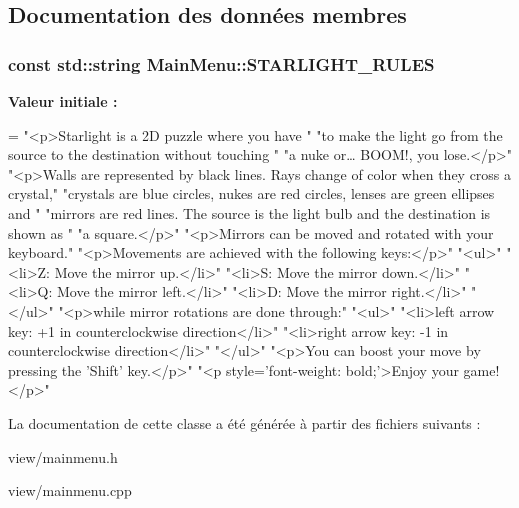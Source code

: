 \subsection{Documentation des données membres}
\hypertarget{classMainMenu_a48a2d4c53fc90f45d2cf63446d811b24}{
\subsubsection[{S\+T\+A\+R\+L\+I\+G\+H\+T\+\_\+\+R\+U\+L\+E\+S}]{\setlength{\rightskip}{0pt plus 5cm}const std\+::string Main\+Menu\+::\+S\+T\+A\+R\+L\+I\+G\+H\+T\+\_\+\+R\+U\+L\+E\+S\hspace{0.3cm}{\ttfamily [static]}}}\label{classMainMenu_a48a2d4c53fc90f45d2cf63446d811b24}
{\bfseries Valeur initiale \+:}
\begin{DoxyCode}
=
    \textcolor{stringliteral}{"<p>Starlight is a 2D puzzle where you have "}
    \textcolor{stringliteral}{"to make the light go from the source to the destination without touching "}
    \textcolor{stringliteral}{"a nuke or… BOOM!, you lose.</p>"}
    \textcolor{stringliteral}{"<p>Walls are represented by black lines. Rays change of color when they cross a crystal,"}
    \textcolor{stringliteral}{"crystals are blue circles, nukes are red circles, lenses are green ellipses and "}
    \textcolor{stringliteral}{"mirrors are red lines. The source is the light bulb and the destination is shown as "}
    \textcolor{stringliteral}{"a square.</p>"}
    \textcolor{stringliteral}{"<p>Mirrors can be moved and rotated with your keyboard."}
    \textcolor{stringliteral}{"<p>Movements are achieved with the following keys:</p>"}
    \textcolor{stringliteral}{"<ul>"}
        \textcolor{stringliteral}{"<li>Z: Move the mirror up.</li>"}
        \textcolor{stringliteral}{"<li>S: Move the mirror down.</li>"}
        \textcolor{stringliteral}{"<li>Q: Move the mirror left.</li>"}
        \textcolor{stringliteral}{"<li>D: Move the mirror right.</li>"}
    \textcolor{stringliteral}{"</ul>"}
    \textcolor{stringliteral}{"<p>while mirror rotations are done through:"}
    \textcolor{stringliteral}{"<ul>"}
        \textcolor{stringliteral}{"<li>left arrow key: +1 in counterclockwise direction</li>"}
        \textcolor{stringliteral}{"<li>right arrow key: -1 in counterclockwise direction</li>"}
    \textcolor{stringliteral}{"</ul>"}
    \textcolor{stringliteral}{"<p>You can boost your move by pressing the 'Shift' key.</p>"}
    \textcolor{stringliteral}{"<p style='font-weight: bold;'>Enjoy your game!</p>"}
\end{DoxyCode}


La documentation de cette classe a été générée à partir des fichiers suivants \+:\begin{DoxyCompactItemize}
\item 
view/mainmenu.\+h\item 
view/mainmenu.\+cpp\end{DoxyCompactItemize}

